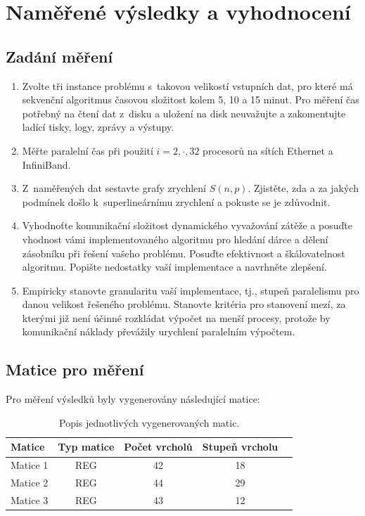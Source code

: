 \documentclass[12pt]{article}
\begin{document}
\section{Naměřené výsledky a vyhodnocení}

\subsection{Zadání měření}
\begin{enumerate}
\item Zvolte tři instance problému s~takovou velikostí vstupních dat, pro které má
sekvenční algoritmus časovou složitost kolem 5, 10 a 15 minut. Pro
měření čas potřebný na čtení dat z~disku a uložení na disk
neuvažujte a zakomentujte ladící tisky, logy, zprávy a výstupy.
\item Měřte paralelní čas při použití $i=2,\cdot,32$ procesorů na sítích Ethernet a InfiniBand.
\item Z~naměřených dat sestavte grafy zrychlení $S(n,p)$. Zjistěte, zda a za jakých podmínek
došlo k~superlineárnímu zrychlení a pokuste se je zdůvodnit.
\item Vyhodnoťte komunikační složitost dynamického vyvažování zátěže a posuďte
vhodnost vámi implementovaného algoritmu pro hledání dárce a dělení
zásobníku při řešení vašeho problému. Posuďte efektivnost a
škálovatelnost algoritmu. Popište nedostatky vaší implementace a
navrhněte zlepšení.
\item Empiricky stanovte
granularitu vaší implementace, tj., stupeň paralelismu pro danou
velikost řešeného problému. Stanovte kritéria pro stanovení mezí, za
kterými již není účinné rozkládat výpočet na menší procesy, protože
by komunikační náklady převážily urychlení paralelním výpočtem.
\end{enumerate}

\subsection{Matice pro měření}
Pro měření výsledků byly vygenerovány následující matice:
\begin{table}[ht]
\centering
\begin{tabular}{|l|c|c|c|c|}
\hline \textbf{Matice} & \textbf{Typ matice} & \textbf{Počet vrcholů} & \textbf{Stupeň vrcholu} \\
\hline 
\hline Matice 1 & REG & 42 & 18 \\ 
\hline Matice 2 & REG & 44 & 29 \\ 
\hline Matice 3 & REG & 43 & 12 \\ 
\hline 
\end{tabular}
\caption{Popis jednotlivých vygenerovaných matic.}
\label{matice_popis}	
\end{table}
\end{document}
